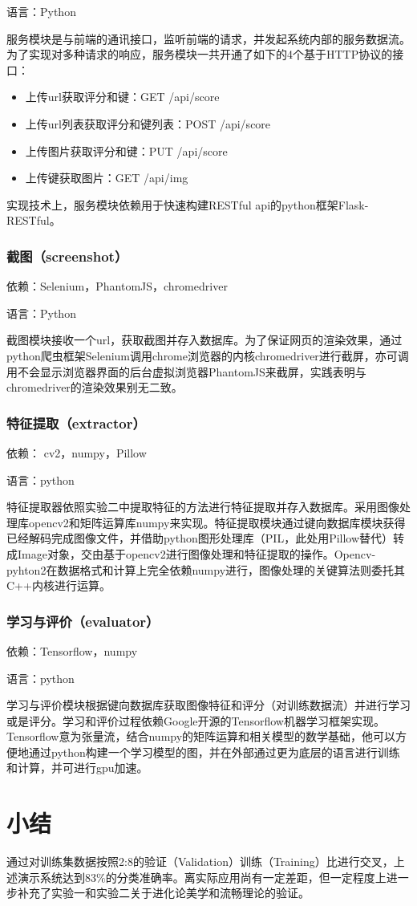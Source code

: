 语言：Python

服务模块是与前端的通讯接口，监听前端的请求，并发起系统内部的服务数据流。为了实现对多种请求的响应，服务模块一共开通了如下的4个基于HTTP协议的接口：

\begin{itemize}
  \item 上传url获取评分和键：GET  /api/score
  \item 上传url列表获取评分和键列表：POST  /api/score
  \item 上传图片获取评分和键：PUT  /api/score
  \item 上传键获取图片：GET /api/img
\end{itemize}

实现技术上，服务模块依赖用于快速构建RESTful api的python框架Flask-RESTful。

\subsubsection{截图（screenshot）}

依赖：Selenium，PhantomJS，chromedriver

语言：Python

截图模块接收一个url，获取截图并存入数据库。为了保证网页的渲染效果，通过python爬虫框架Selenium调用chrome浏览器的内核chromedriver进行截屏，亦可调用不会显示浏览器界面的后台虚拟浏览器PhantomJS来截屏，实践表明与chromedriver的渲染效果别无二致。

\subsubsection{特征提取（extractor）}
依赖： cv2，numpy，Pillow

语言：python

特征提取器依照实验二中提取特征的方法进行特征提取并存入数据库。采用图像处理库opencv2和矩阵运算库numpy来实现。特征提取模块通过键向数据库模块获得已经解码完成图像文件，并借助python图形处理库（PIL，此处用Pillow替代）转成Image对象，交由基于opencv2进行图像处理和特征提取的操作。Opencv-pyhton2在数据格式和计算上完全依赖numpy进行，图像处理的关键算法则委托其C++内核进行运算。

\subsubsection{学习与评价（evaluator）}
依赖：Tensorflow，numpy

语言：python

学习与评价模块根据键向数据库获取图像特征和评分（对训练数据流）并进行学习或是评分。学习和评价过程依赖Google开源的Tensorflow机器学习框架实现。Tensorflow意为张量流，结合numpy的矩阵运算和相关模型的数学基础，他可以方便地通过python构建一个学习模型的图，并在外部通过更为底层的语言进行训练和计算，并可进行gpu加速。

\section{小结}
通过对训练集数据按照2:8的验证（Validation）训练（Training）比进行交叉，上述演示系统达到$83\%$的分类准确率。离实际应用尚有一定差距，但一定程度上进一步补充了实验一和实验二关于进化论美学和流畅理论的验证。
